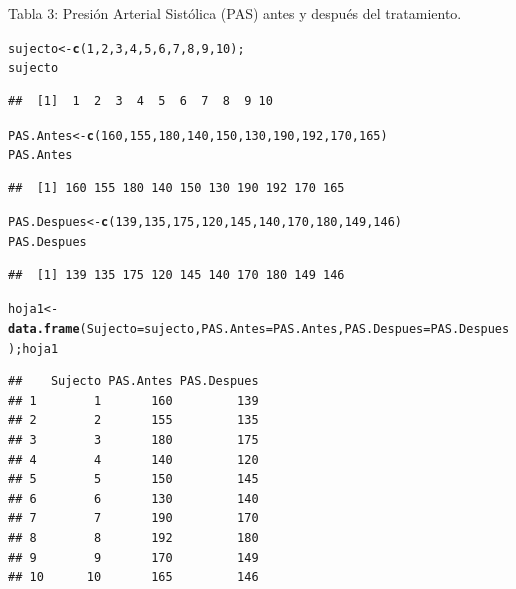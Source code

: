 \documentclass[12pt,letterpaper]{article}\usepackage[]{graphicx}\usepackage[]{color}
\makeatletter
\newcommand{\hlnum}[1]{\textcolor[rgb]{0.686,0.059,0.569}{#1}}%
\newcommand{\hlstd}[1]{\textcolor[rgb]{0.345,0.345,0.345}{#1}}%
\newcommand{\hlkwb}[1]{\textcolor[rgb]{0.69,0.353,0.396}{#1}}%
\newcommand{\hlkwc}[1]{\textcolor[rgb]{0.333,0.667,0.333}{#1}}%
\newcommand{\hlkwd}[1]{\textcolor[rgb]{0.737,0.353,0.396}{\textbf{#1}}}%
\newenvironment{kframe}{%
 \def\at@end@of@kframe{}%
 \ifinner\ifhmode%
  \def\at@end@of@kframe{\end{minipage}}%
  \begin{minipage}{\columnwidth}%
 \fi\fi%
 \def\FrameCommand##1{\hskip\@totalleftmargin \hskip-\fboxsep
 \colorbox{shadecolor}{##1}\hskip-\fboxsep
     \hskip-\linewidth \hskip-\@totalleftmargin \hskip\columnwidth}%
 \MakeFramed {\advance\hsize-\width
   \@totalleftmargin\z@ \linewidth\hsize
   \@setminipage}}%
 {\par\unskip\endMakeFramed%
 \at@end@of@kframe}
\newenvironment{knitrout}{}{} %
\makeatother
\begin{document}
Tabla 3: Presi\'on Arterial Sist\'olica (PAS) antes y despu\'es del tratamiento. 
\begin{knitrout}
\color{fgcolor}\begin{kframe}
\begin{alltt}
\hlstd{sujecto} \hlkwb{<-} \hlkwd{c}\hlstd{(}\hlnum{1}\hlstd{,} \hlnum{2}\hlstd{,} \hlnum{3}\hlstd{,} \hlnum{4}\hlstd{,} \hlnum{5}\hlstd{,} \hlnum{6}\hlstd{,} \hlnum{7}\hlstd{,} \hlnum{8}\hlstd{,} \hlnum{9}\hlstd{,} \hlnum{10}\hlstd{);}
\hlstd{sujecto}
\end{alltt}
\begin{verbatim}
##  [1]  1  2  3  4  5  6  7  8  9 10
\end{verbatim}
\begin{alltt}
\hlstd{PAS.Antes} \hlkwb{<-} \hlkwd{c}\hlstd{(}\hlnum{160}\hlstd{,} \hlnum{155}\hlstd{,} \hlnum{180}\hlstd{,} \hlnum{140}\hlstd{,} \hlnum{150}\hlstd{,} \hlnum{130}\hlstd{,} \hlnum{190}\hlstd{,} \hlnum{192}\hlstd{,} \hlnum{170}\hlstd{,} \hlnum{165}\hlstd{)}
\hlstd{PAS.Antes}
\end{alltt}
\begin{verbatim}
##  [1] 160 155 180 140 150 130 190 192 170 165
\end{verbatim}
\begin{alltt}
\hlstd{PAS.Despues} \hlkwb{<-} \hlkwd{c}\hlstd{(}\hlnum{139}\hlstd{,} \hlnum{135}\hlstd{,} \hlnum{175}\hlstd{,} \hlnum{120}\hlstd{,} \hlnum{145}\hlstd{,} \hlnum{140}\hlstd{,} \hlnum{170}\hlstd{,} \hlnum{180}\hlstd{,} \hlnum{149}\hlstd{,} \hlnum{146}\hlstd{)}
\hlstd{PAS.Despues}
\end{alltt}
\begin{verbatim}
##  [1] 139 135 175 120 145 140 170 180 149 146
\end{verbatim}
\begin{alltt}
\hlstd{hoja1} \hlkwb{<-} \hlkwd{data.frame}\hlstd{(}\hlkwc{Sujecto}\hlstd{=sujecto,} \hlkwc{PAS.Antes}\hlstd{=PAS.Antes,} \hlkwc{PAS.Despues}\hlstd{=PAS.Despues); hoja1}
\end{alltt}
\begin{verbatim}
##    Sujecto PAS.Antes PAS.Despues
## 1        1       160         139
## 2        2       155         135
## 3        3       180         175
## 4        4       140         120
## 5        5       150         145
## 6        6       130         140
## 7        7       190         170
## 8        8       192         180
## 9        9       170         149
## 10      10       165         146
\end{verbatim}
\end{kframe}
\end{knitrout}
\end{document}
